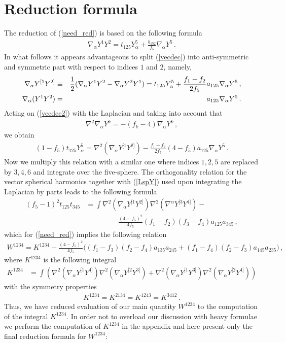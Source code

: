 \documentclass[12pt,a4paper]{article}
\numberwithin{equation}{section}
\newcommand{\bea}{\begin{eqnarray}}
\newcommand{\eea}{\end{eqnarray}}
\newcommand{\bal}{\begin{equation}\begin{aligned}}
\newcommand{\eal}{\end{aligned}\end{equation}}
\def\ov{\over}
\def\la{\label}
\def\a {\alpha}
\def\na{{\nabla}}
\def\a {\alpha}
\def\la{\label}
\def\ov{\over}
\begin{document}
\section{Reduction formula}
The reduction of (\ref{need_red}) is based on the following formula  \cite{Arutyunov:1999fb}
\bal
\na_{\a} Y^1 Y^2=t_{125}Y_{\a}^5+\frac{b_{152}}{f_5}\na_{\a }Y^5 \, .
\la{vecdec}
\eal
In what follows it appears advantageous to split (\ref{vecdec}) into anti-symmetric and symmetric part with respect to indices $1$ and $2$, namely,
\bea
\na_{\a} Y^{[1} Y^{2]}&\equiv &{1\ov2}(\na_{\a} Y^1 Y^2-\na_{\a} Y^2 Y^1)= t_{125}Y_{\a}^5+\frac{f_{1}-f_{2}}{2f_5}a_{125}\na_{\a }Y^5\,, 
\la{vecdec2} \\
\na_{\a} (Y^1 Y^2)&=&a_{125}\na_{\a }Y^5 \, .
\la{vecdec2s}
\eea
Acting on (\ref{vecdec2}) with the Laplacian and taking into account that 
\bal
\la{LspY}
\na^2 \na_\a Y^k=-(f_k-4)\na_\a Y^k\, ,
\eal
we obtain
\bal
(1-f_5)t_{125}Y_{\a}^5=\na^2(\na_{\a} Y^{[1} Y^{2]})-\frac{f_{1}-f_{2}}{2f_5}(4-f_5)a_{125}\na_{\a }Y^5\, .
\la{vecdec34}
\eal
Now we multiply this relation with a similar one where indices $1,2,5$ are replaced by $3,4,6$ and integrate over the five-sphere. The orthogonality relation for the vector spherical harmonics 
together with (\ref{LspY}) used upon integrating the Laplacian by parts leads to the following formula 
\bal
(f_5-1)^2t_{125}t_{345}&=\int \na^2(\na_{\a}Y^{[1}Y^{2]})\na^2(\na^\a Y^{[3} Y^{4]})- \nonumber\\
&~~~~~~~~~~~~~~~-\frac{(4-f_5)^2}{4f_5}(f_1-f_2)(f_3-f_4)a_{125}a_{345} \, ,
\eal
which for (\ref{need_red}) implies the following relation
\bal
W^{1234}=K^{1234}-\frac{(4-f_5)^2}{4f_5}\Big((f_1-f_3)(f_2-f_4)a_{135}a_{245} +(f_1-f_4)(f_2-f_3)a_{145}a_{235}\Big)\, , \nonumber
\eal
where $K^{1234}$ is the following integral
\bal
\la{K}
K^{1234}&=\int \left( \na^2(\na_{\a} Y^{[1} Y^{4]})\na^2(\na_{\a} Y^{[2} Y^{3]}) + \na^2(\na_{\a} Y^{[1} Y^{3]})\na^2(\na_{\a} Y^{[2} Y^{4]}) \right)
\eal
with the symmetry properties
\bal
K^{1234}=K^{2134}=K^{1243}=K^{3412}\, .
\eal
Thus, we have reduced evaluation of our main quantity $W^{1234}$ to the computation of the integral $K^{1234}$. In order not to overload our discussion with heavy formulae 
we perform the computation of $K^{1234}$ in the appendix and here present only the final reduction formula for $W^{1234}$:
\end{document}
